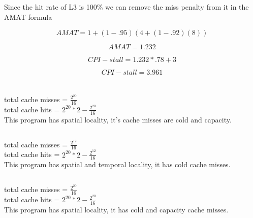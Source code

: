 \documentclass{article}
\begin{document}
\subsection{}

Since the hit rate of L3 is 100\% we can remove the miss penalty from it in the AMAT formula

\begin{equation*}
  AMAT = 1+(1-.95)(4+(1-.92)(8))
\end{equation*}

\begin{equation*}
  AMAT = 1.232
\end{equation*}

\begin{equation*}
  CPI-stall = 1.232 *.78 + 3
\end{equation*}

\begin{equation*}
  CPI-stall = 3.961
\end{equation*}

\section{}

\subsection{}
total cache misses = $\frac{2^{20}}{16}$\\
total cache hits = $2^{20}*2 - \frac{2^{20}}{16}$\\
This program has spatial locality, it's cache misses are cold and capacity.

\subsection{}
total cache misses = $\frac{2^{12}}{16}$\\
total cache hits = $2^{20}*2 - \frac{2^{12}}{16}$\\
This program has spatial and temporal locality, it has cold cache misses.

\subsection{}
total cache misses = $\frac{2^{20}}{16}$\\
total cache hits = $2^{20} * 2 - \frac{2^{20}}{16}$\\
This program has spatial locality, it has cold and capacity cache misses.
\end{document}
